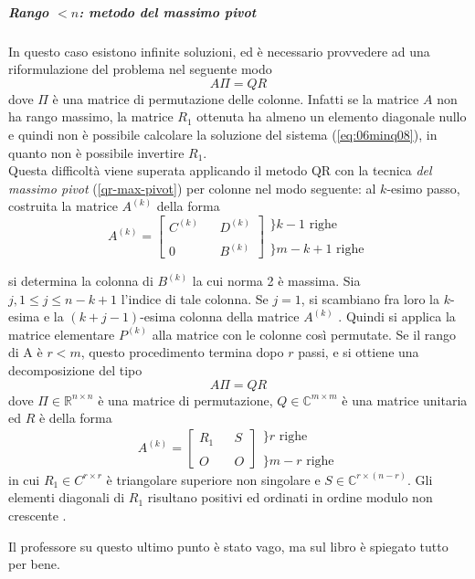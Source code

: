 \subparagraph{Rango $<n$: metodo del massimo pivot} 
In questo caso esistono infinite soluzioni, ed \`e necessario
provvedere ad una riformulazione del problema nel seguente modo
$$ A\Pi = QR$$ 
dove $\Pi$ \`e una matrice di permutazione delle colonne.  Infatti se
la matrice $A$ non ha rango massimo, la matrice $R_1$ ottenuta ha
almeno un elemento diagonale nullo e quindi non \`e possibile
calcolare la soluzione del sistema (\ref{eq:06minq08}), in quanto non \`e possibile invertire $R_1$. \\
Questa difficolt\`a viene superata applicando il metodo QR con la
tecnica \emph{del massimo pivot} (\ref{qr-max-pivot}) per colonne nel
modo seguente: al $k$-esimo passo, costruita la matrice $A^{(k)}$
della forma
$$
A^{(k)} = \left[
  \begin{array}{lll} 
    C^{(k)} &  & D^{(k)}                                  \\ 
            &  &                                          \\ 0 &  & B^{(k)}
  \end{array} 
\right]
\begin{array}{l} 
  \} k-1 \text{ righe}                                    \\ 
                                                          \\ 
  \}m-k+1 \text{ righe}
\end{array}
$$

si determina la colonna di $B^{(k)}$ la cui norma 2 \`e massima. Sia
$j, 1 \leq j \leq n-k+1$ l'indice di tale colonna. Se $j = 1$, si
scambiano fra loro la $k$-esima e la $(k + j − 1)$-esima colonna della
matrice $A^{(k)}$ . Quindi si applica la matrice elementare $P^{(k)}$
alla matrice con le colonne cos\`i permutate.  Se il rango di A \`e $r
< m$, questo procedimento termina dopo $r$ passi, e si ottiene una
decomposizione del tipo
$$ A\Pi = QR$$ 
dove $\Pi \in \mathbb{R}^{n \times n}$ \`e una matrice di
permutazione, $Q \in \mathbb{C}^{m \times m}$ \`e una matrice unitaria
ed $R$ \`e della forma
$$
 A^{(k)} = \left[
\begin{array}{lll} R_1 & & S \\ & & \\ O & & O
\end{array} \right]
\begin{array}{l} \} r \text{ righe} \\ \\ \}m-r \text{ righe}
\end{array}
$$
in cui $R_1 \in C^{r \times r}$ \`e triangolare superiore non
singolare e $S \in \mathbb{C}^{r \times (n -r)}$. Gli elementi
diagonali di $R_1$ risultano positivi ed ordinati in ordine modulo non
crescente .
\begin{notes} Il professore su questo ultimo punto \`e stato vago, ma
sul libro \`e spiegato tutto per bene.
\end{notes}

